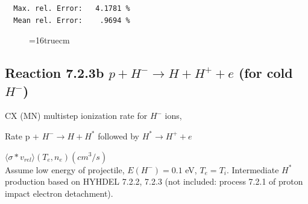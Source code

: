 \documentclass[12pt,dvipdfmx]{article}
\begin{document}
\begin{small}
\begin{verbatim}
  Max. rel. Error:   4.1781 %
  Mean rel. Error:    .9694 %
\end{verbatim}\end{small}
\begin{figure} \label{7.2.3a}
\epsfxsize=16truecm
\end{figure}
\newpage

\subsection{
Reaction 7.2.3b   $ p + H^{-} \rightarrow  H + H^+ + e$ (for cold $H^-$)
}

  CX (MN) multistep ionization rate for $H^-$ ions,
 \cite{kn:Sawada}

  Rate p + $H^- \rightarrow H + H^*$ followed by $H^* \rightarrow H^+
+e$

$  \langle \sigma*v_{rel} \rangle(T_e,n_e) (cm^3/s)$ \\
Assume low energy of projectile, $E(H^-)=0.1$ eV, $T_e = T_i$.
Intermediate $H^*$ production based on HYHDEL 7.2.2, 7.2.3
(not included: process 7.2.1 of proton impact electron detachment).
\end{document}
